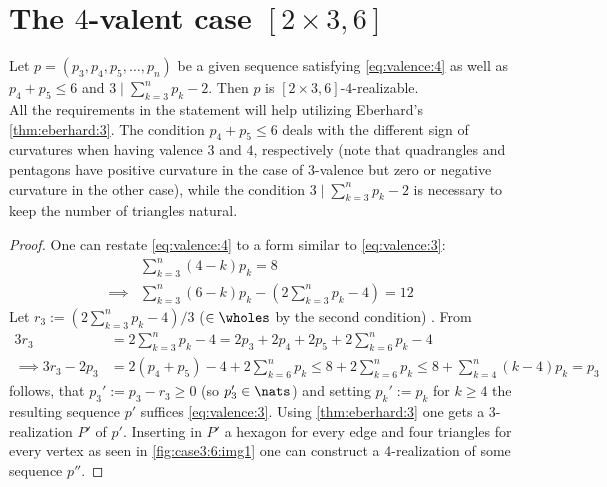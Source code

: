 \section{The $4$-valent case $[2 \times 3, 6]$}
\begin{lemma}\label{thm:case3:6:mainlemma}
  Let $p = (p_3, p_4, p_5, \dots, p_n)$ be a given sequence satisfying \autoref{eq:valence:4} as well as $p_4 + p_5 \leq 6$ and $3 \mid \sum_{k=3}^{n} p_k - 2$. Then $p$ is $[2 \times 3, 6]$-$4$-realizable.\\

  All the requirements in the statement will help utilizing Eberhard's \autoref{thm:eberhard:3}. The condition $p_4 + p_5 \leq 6$ deals with the different sign of curvatures when having valence $3$ and $4$, respectively (note that quadrangles and pentagons have positive curvature in the case of $3$-valence but zero or negative curvature in the other case), while the condition $3 \mid \sum_{k=3}^{n} p_k - 2$ is necessary to keep the number of triangles natural.
  \begin{proof}
    One can restate \autoref{eq:valence:4} to a form similar to \autoref{eq:valence:3}:
    \begin{align*}
      & \sum_{k=3}^n \left( 4 - k \right) p_k = 8 \\
      \implies & \sum_{k=3}^n \left( 6 - k \right) p_k - \left(2 \sum_{k=3}^n  p_k - 4 \right) = 12
    \end{align*}
    Let $r_3 := (2 \sum_{k=3}^{n} p_k - 4)/3$ ($\in \wholes$ by the second condition) . From
    \begin{align*}
      3 r_3 &= 2 \sum_{k=3}^{n} p_k - 4 =  2 p_3 + 2 p_4 + 2 p_5 + 2 \sum_{k=6}^{n} p_k - 4\\
      \implies 3 r_3 - 2 p_3 &= 2(p_4 + p_5) - 4 + 2 \sum_{k=6}^{n} p_k \leq 8 + 2 \sum_{k=6}^{n} p_k \leq 8 + \sum_{k=4}^{n} (k - 4) p_k = p_3
    \end{align*}
    follows, that $p_3' := p_3 - r_3 \geq 0$ (so $p'_3 \in \nats$) and setting $p_k' := p_k$ for $k \geq 4$ the resulting sequence $p'$ suffices \autoref{eq:valence:3}. Using \autoref{thm:eberhard:3} one gets a $3$-realization $P'$ of $p'$. Inserting in $P'$ a hexagon for every edge and four triangles for every vertex as seen in \autoref{fig:case3:6:img1} one can construct a $4$-realization of some sequence $p''$.


\end{proof}
\end{lemma}
